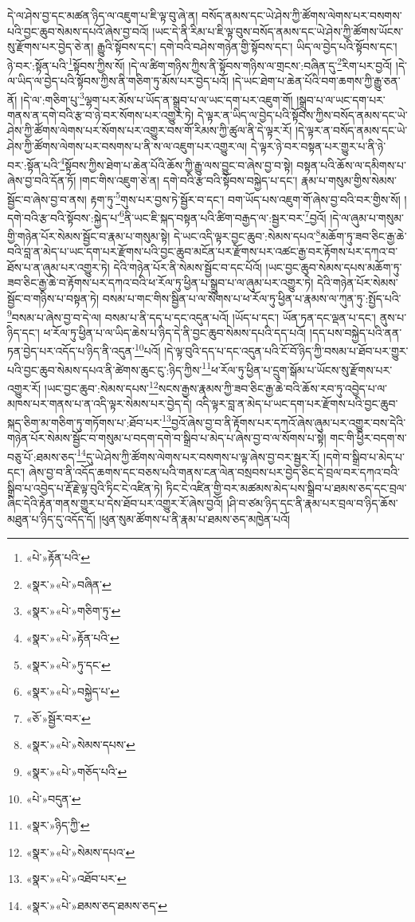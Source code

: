 དེ་ལ་ཤེས་བྱ་དང་མཚན་ཉིད་ལ་འཇུག་པ་ཇི་ལྟ་བུ་ཞེ་ན། བསོད་ནམས་དང་ཡེ་ཤེས་ཀྱི་ཚོགས་ལེགས་པར་བསགས་པའི་བྱང་ཆུབ་སེམས་དཔའོ་ཞེས་བྱ་བའོ། །ཡང་དེ་ནི་རིམ་པ་ཇི་ལྟ་བུས་བསོད་ནམས་དང་ཡེ་ཤེས་ཀྱི་ཚོགས་ཡོངས་སུ་རྫོགས་པར་བྱེད་ཅེ་ན། རྒྱུའི་སྟོབས་དང་། དགེ་བའི་བཤེས་གཉེན་གྱི་སྟོབས་དང་། ཡིད་ལ་བྱེད་པའི་སྟོབས་དང་། ཉེ་བར་:སྟོན་པའི་\footnote{«པེ་»རྟོན་པའི་}སྟོབས་ཀྱིས་སོ། །དེ་ལ་ཚིག་གཉིས་ཀྱིས་ནི་སྟོབས་གཉིས་ལ་གྲངས་:བཞིན་དུ་\footnote{«སྣར་»«པེ་»བཞིན་}རིག་པར་བྱའོ། །དེ་ལ་ཡིད་ལ་བྱེད་པའི་སྟོབས་ཀྱིས་ནི་གཅིག་ཏུ་མོས་པར་བྱེད་པའོ། །དེ་ཡང་ཐེག་པ་ཆེན་པོའི་བག་ཆགས་ཀྱི་རྒྱུ་ཅན་ནོ། །དེ་ལ་:གཅིག་པུ་\footnote{«སྣར་»«པེ་»གཅིག་ཏུ་}ལྷག་པར་མོས་པ་ཡོད་ན་སྒྲུབ་པ་ལ་ཡང་དག་པར་འཇུག་གོ། །སྒྲུབ་པ་ལ་ཡང་དག་པར་གནས་ན་དགེ་བའི་རྩ་བ་ཉེ་བར་སོགས་པར་འགྱུར་ཏེ། དེ་ལྟར་ན་ཡིད་ལ་བྱེད་པའི་སྟོབས་ཀྱིས་བསོད་ནམས་དང་ཡེ་ཤེས་ཀྱི་ཚོགས་ལེགས་པར་སོགས་པར་འགྱུར་བས་གོ་རིམས་ཀྱི་ཚུལ་ནི་དེ་ལྟར་རོ། །དེ་ལྟར་ན་བསོད་ནམས་དང་ཡེ་ཤེས་ཀྱི་ཚོགས་ལེགས་པར་བསགས་པ་ནི་ས་ལ་འཇུག་པར་འགྱུར་ལ། དེ་ལྟར་ཉེ་བར་བསྟན་པར་གྱུར་པ་ནི་ཉེ་བར་:སྟོན་པའི་\footnote{«སྣར་»«པེ་»རྟོན་པའི་}སྟོབས་ཀྱིས་ཐེག་པ་ཆེན་པོའི་ཆོས་ཀྱི་རྒྱུ་ལས་བྱུང་བ་ཞེས་བྱ་བ་སྟེ། བསྟན་པའི་ཆོས་ལ་དམིགས་པ་ཞེས་བྱ་བའི་དོན་ཏོ། །གང་གིས་འཇུག་ཅེ་ན། དགེ་བའི་རྩ་བའི་སྟོབས་བསྐྱེད་པ་དང་། རྣམ་པ་གསུམ་གྱིས་སེམས་སྦྱོང་བ་ཞེས་བྱ་བ་ནས། རྟག་ཏུ་\footnote{«སྣར་»«པེ་»ཏུ་དང་}གུས་པར་བྱས་ཏེ་སྦྱོར་བ་དང་། བག་ཡོད་པས་འཇུག་གོ་ཞེས་བྱ་བའི་བར་གྱིས་སོ། །དགེ་བའི་རྩ་བའི་སྟོབས་:སྐྱེད་པ་\footnote{«སྣར་»«པེ་»བསྐྱེད་པ་}ནི་ཡང་ཇི་སྐད་བསྟན་པའི་ཚིག་བརྒྱད་ལ་:སྦྱར་བར་\footnote{«ཅོ་»སྦྱོར་བར་}བྱའོ། །དེ་ལ་ཞུམ་པ་གསུམ་གྱི་གཉེན་པོར་སེམས་སྦྱོང་བ་རྣམ་པ་གསུམ་སྟེ། དེ་ཡང་འདི་ལྟར་བྱང་ཆུབ་:སེམས་དཔའ་\footnote{«སྣར་»«པེ་»སེམས་དཔས་}མཆོག་ཏུ་ཟབ་ཅིང་རྒྱ་ཆེ་བའི་བླ་ན་མེད་པ་ཡང་དག་པར་རྫོགས་པའི་བྱང་ཆུབ་མངོན་པར་རྫོགས་པར་འཚང་རྒྱ་བར་རྟོགས་པར་དཀའ་བ་ཐོས་པ་ན་ཞུམ་པར་འགྱུར་ཏེ། དེའི་གཉེན་པོར་ནི་སེམས་སྦྱོང་བ་དང་པོའོ། །ཡང་བྱང་ཆུབ་སེམས་དཔས་མཆོག་ཏུ་ཟབ་ཅིང་རྒྱ་ཆེ་བ་རྟོགས་པར་དཀའ་བའི་ཕ་རོལ་ཏུ་ཕྱིན་པ་སྒྲུབ་པ་ལ་ཞུམ་པར་འགྱུར་ཏེ། དེའི་གཉེན་པོར་སེམས་སྦྱོང་བ་གཉིས་པ་བསྟན་ཏེ། བསམ་པ་གང་གིས་སྦྱིན་པ་ལ་སོགས་པ་ཕ་རོལ་ཏུ་ཕྱིན་པ་རྣམས་ལ་ཀུན་ཏུ་:སྤྱོད་པའི་\footnote{«སྣར་»«པེ་»གཅོད་པའི་}བསམ་པ་ཞེས་བྱ་བ་དེ་ལ། བསམ་པ་ནི་དད་པ་དང་འདུན་པའོ། །ཡོད་པ་དང་། ཡོན་ཏན་དང་ལྡན་པ་དང་། ནུས་པ་ཉིད་དང་། ཕ་རོལ་ཏུ་ཕྱིན་པ་ལ་ཡིད་ཆེས་པ་ཉིད་དེ་ནི་བྱང་ཆུབ་སེམས་དཔའི་དད་པའོ། །དད་པས་བསྐྱེད་པའི་ནན་ཏན་བྱེད་པར་འདོད་པ་ཉིད་ནི་འདུན་\footnote{«པེ་»བདུན་}པའོ། །དེ་ལྟ་བུའི་དད་པ་དང་འདུན་པའི་ངོ་བོ་ཉིད་ཀྱི་བསམ་པ་ཐོབ་པར་གྱུར་པའི་བྱང་ཆུབ་སེམས་དཔའ་ནི་ཚེགས་ཆུང་ངུ་:ཉིད་ཀྱིས་\footnote{«སྣར་»ཉིད་ཀྱི་}ཕ་རོལ་ཏུ་ཕྱིན་པ་དྲུག་སྒོམ་པ་ཡོངས་སུ་རྫོགས་པར་འགྱུར་རོ། །ཡང་བྱང་ཆུབ་:སེམས་དཔས་\footnote{«སྣར་»«པེ་»སེམས་དཔའ་}སངས་རྒྱས་རྣམས་ཀྱི་ཟབ་ཅིང་རྒྱ་ཆེ་བའི་ཆོས་རབ་ཏུ་འབྱེད་པ་ལ་མཁས་པར་གནས་པ་ན་འདི་ལྟར་སེམས་པར་བྱེད་དེ། འདི་ལྟར་བླ་ན་མེད་པ་ཡང་དག་པར་རྫོགས་པའི་བྱང་ཆུབ་སྐད་ཅིག་མ་གཅིག་ཏུ་གཏོགས་པ་:ཐོབ་པར་\footnote{«སྣར་»«པེ་»འཐོབ་པར་}བྱའོ་ཞེས་བྱ་བ་ནི་རྟོགས་པར་དཀའོ་ཞེས་ཞུམ་པར་འགྱུར་བས་དེའི་གཉེན་པོར་སེམས་སྦྱོང་བ་གསུམ་པ་བདག་དགེ་བ་སྒྲིབ་པ་མེད་པ་ཞེས་བྱ་བ་ལ་སོགས་པ་སྟེ། གང་གི་ཕྱིར་བདག་ས་བཅུ་པོ་:ཐམས་ཅད་\footnote{«སྣར་»«པེ་»ཐམས་ཅད་ཐམས་ཅད་}དུ་ཡེ་ཤེས་ཀྱི་ཚོགས་ལེགས་པར་བསགས་པ་ལྟ་ཞེས་བྱ་བར་སྦྱར་རོ། །དགེ་བ་སྒྲིབ་པ་མེད་པ་དང་། ཞེས་བྱ་བ་ནི་འདོད་ཆགས་དང་བཅས་པའི་གནས་ངན་ལེན་བསྲབས་པར་བྱེད་ཅིང་དེ་བྲལ་བར་དཀའ་བའི་སྒྲིབ་པ་འབྱེད་པ་རྡོ་རྗེ་ལྟ་བུའི་ཏིང་ངེ་འཛིན་ཏེ། ཏིང་ངེ་འཛིན་གྱི་བར་མཚམས་མེད་པས་སྒྲིབ་པ་ཐམས་ཅད་དང་བྲལ་ཞིང་དེའི་རྟེན་གནས་གྱུར་པ་དེས་ཐོབ་པར་འགྱུར་རོ་ཞེས་བྱའོ། །ཤི་བ་ཙམ་ཉིད་དང་ནི་རྣམ་པར་བྲལ་བ་ཉིད་ཆོས་མཐུན་པ་ཉིད་དུ་འདོད་དོ། །ཕུན་སུམ་ཚོགས་པ་ནི་རྣམ་པ་ཐམས་ཅད་མཁྱེན་པའོ། 